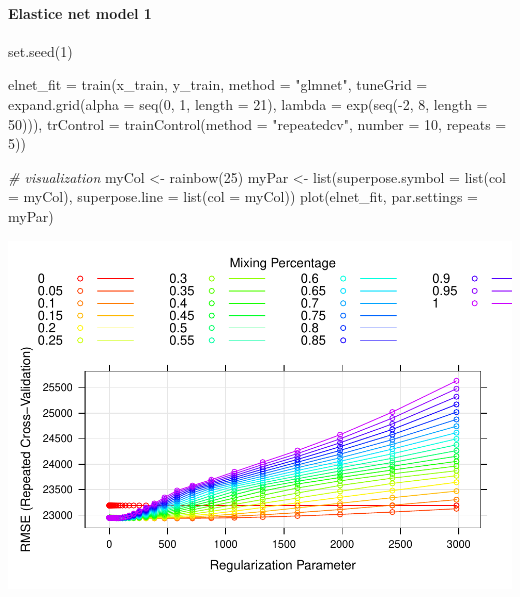 \documentclass[
]{article}
\newenvironment{Shaded}{\begin{snugshade}}{\end{snugshade}}
\newcommand{\AttributeTok}[1]{\textcolor[rgb]{0.77,0.63,0.00}{#1}}
\newcommand{\CommentTok}[1]{\textcolor[rgb]{0.56,0.35,0.01}{\textit{#1}}}
\newcommand{\DecValTok}[1]{\textcolor[rgb]{0.00,0.00,0.81}{#1}}
\newcommand{\FunctionTok}[1]{\textcolor[rgb]{0.00,0.00,0.00}{#1}}
\newcommand{\NormalTok}[1]{#1}
\newcommand{\OtherTok}[1]{\textcolor[rgb]{0.56,0.35,0.01}{#1}}
\newcommand{\SpecialCharTok}[1]{\textcolor[rgb]{0.00,0.00,0.00}{#1}}
\newcommand{\StringTok}[1]{\textcolor[rgb]{0.31,0.60,0.02}{#1}}
\begin{document}
\hypertarget{elastice-net-model-1}{%
\paragraph{Elastice net model 1}\label{elastice-net-model-1}}

\begin{Shaded}
\begin{Highlighting}[]
\FunctionTok{set.seed}\NormalTok{(}\DecValTok{1}\NormalTok{)}

\NormalTok{elnet\_fit }\OtherTok{=} \FunctionTok{train}\NormalTok{(x\_train, y\_train, }
                  \AttributeTok{method =} \StringTok{"glmnet"}\NormalTok{,}
                  \AttributeTok{tuneGrid =} \FunctionTok{expand.grid}\NormalTok{(}\AttributeTok{alpha =} \FunctionTok{seq}\NormalTok{(}\DecValTok{0}\NormalTok{, }\DecValTok{1}\NormalTok{, }\AttributeTok{length =} \DecValTok{21}\NormalTok{),}
                                         \AttributeTok{lambda =} \FunctionTok{exp}\NormalTok{(}\FunctionTok{seq}\NormalTok{(}\SpecialCharTok{{-}}\DecValTok{2}\NormalTok{, }\DecValTok{8}\NormalTok{, }\AttributeTok{length =} \DecValTok{50}\NormalTok{))),}
                  \AttributeTok{trControl =} \FunctionTok{trainControl}\NormalTok{(}\AttributeTok{method =} \StringTok{"repeatedcv"}\NormalTok{, }\AttributeTok{number =} \DecValTok{10}\NormalTok{, }\AttributeTok{repeats =} \DecValTok{5}\NormalTok{))}

\CommentTok{\# visualization}
\NormalTok{myCol }\OtherTok{\textless{}{-}} \FunctionTok{rainbow}\NormalTok{(}\DecValTok{25}\NormalTok{)}
\NormalTok{myPar }\OtherTok{\textless{}{-}} \FunctionTok{list}\NormalTok{(}\AttributeTok{superpose.symbol =} \FunctionTok{list}\NormalTok{(}\AttributeTok{col =}\NormalTok{ myCol),}
\AttributeTok{superpose.line =} \FunctionTok{list}\NormalTok{(}\AttributeTok{col =}\NormalTok{ myCol))}
\FunctionTok{plot}\NormalTok{(elnet\_fit, }\AttributeTok{par.settings =}\NormalTok{ myPar)}
\end{Highlighting}
\end{Shaded}

\includegraphics{p8106_hw1_qz2266_final_files/figure-latex/unnamed-chunk-6-1.pdf}
\end{document}
